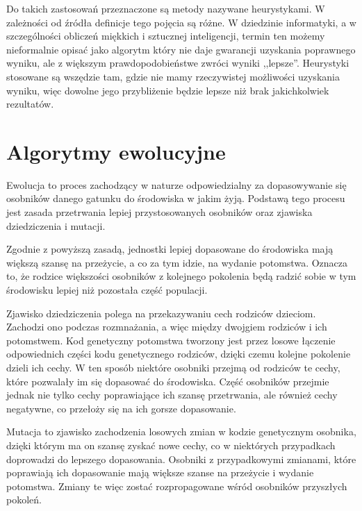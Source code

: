 \documentclass[twoside]{iisthesis}
\begin{document}
Do takich zastosowań przeznaczone są metody nazywane heurystykami. 
W zależności od źródła definicje tego pojęcia są różne. 
W dziedzinie informatyki, a w szczególności obliczeń miękkich i sztucznej inteligencji, termin ten możemy nieformalnie opisać jako algorytm który nie daje gwarancji uzyskania poprawnego wyniku, ale z większym prawdopodobieństwe zwróci wyniki ,,lepsze''.
Heurystyki stosowane są wszędzie tam, gdzie nie mamy rzeczywistej możliwości uzyskania wyniku, więc dowolne jego przybliżenie będzie lepsze niż brak jakichkolwiek rezultatów.

\section{Algorytmy ewolucyjne} \label{section:eaShortDesc}

Ewolucja to proces zachodzący w naturze odpowiedzialny za dopasowywanie się osobników danego gatunku do środowiska w jakim żyją. 
Podstawą tego procesu jest zasada przetrwania lepiej przystosowanych osobników oraz zjawiska dziedziczenia i mutacji.

Zgodnie z powyższą zasadą, jednostki lepiej dopasowane do środowiska mają większą szansę na przeżycie, a co za tym idzie, na wydanie potomstwa.
Oznacza to, że rodzice większości osobników z kolejnego pokolenia będą radzić sobie w tym środowisku lepiej niż pozostała część populacji.

Zjawisko dziedziczenia polega na przekazywaniu cech rodziców dzieciom. 
Zachodzi ono podczas rozmnażania, a więc między dwojgiem rodziców i ich potomstwem. 
Kod genetyczny potomstwa tworzony jest przez losowe łączenie odpowiednich części kodu genetycznego rodziców, dzięki czemu kolejne pokolenie dzieli ich cechy. 
W ten sposób niektóre osobniki przejmą od rodziców te cechy, które pozwalały im się dopasować do środowiska.
Część osobników przejmie jednak nie tylko cechy poprawiające ich szansę przetrwania, ale również cechy negatywne, co przełoży się na ich gorsze dopasowanie.

Mutacja to zjawisko zachodzenia losowych zmian w kodzie genetycznym osobnika, dzięki którym ma on szansę zyskać nowe cechy, co w niektórych przypadkach doprowadzi do lepszego dopasowania.
Osobniki z przypadkowymi zmianami, które poprawiają ich dopasowanie mają większe szanse na przeżycie i wydanie potomstwa.
Zmiany te więc zostać rozpropagowane wśród osobników przyszłych pokoleń.
\end{document}
